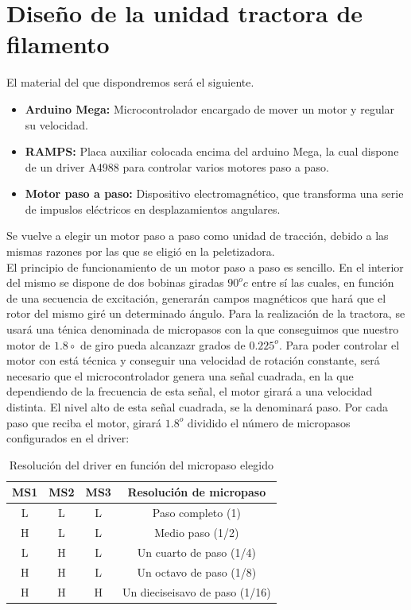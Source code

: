 
\chapter{Diseño de la unidad tractora de filamento}
\label{ane:tractora}
El material del que dispondremos será el siguiente.

\begin{itemize}
	\item{\textbf{Arduino Mega:} Microcontrolador encargado de mover un motor y regular su velocidad.}
	\item{\textbf{RAMPS:} Placa auxiliar colocada encima del arduino Mega, la cual dispone de un driver A4988 para controlar varios motores paso a paso.}
	\item{\textbf{Motor paso a paso:} Dispositivo electromagnético, que transforma una serie de impuslos eléctricos en desplazamientos angulares.}
\end{itemize}

Se vuelve a elegir un motor paso a paso como unidad de tracción, debido a las mismas razones por las que se eligió en la peletizadora.\\

El principio de funcionamiento de un motor paso a paso es sencillo. En el interior del mismo se dispone de dos bobinas giradas $90^oc$ entre sí \cite{pasoapaso} las cuales, en función de una secuencia de excitación, generarán campos magnéticos que hará que el rotor del mismo giré un determinado ángulo. Para la realización de la tractora, se usará una ténica denominada de micropasos con la que conseguimos que nuestro motor de $1.8 \circ$ de giro pueda alcanzazr grados de $0.225^o$. Para poder controlar el motor con está técnica y conseguir una velocidad de rotación constante, será necesario que el microcontrolador genera una señal cuadrada, en la que dependiendo de la frecuencia de esta señal, el motor girará a una velocidad distinta. El nivel alto de esta señal cuadrada, se la denominará paso. Por cada paso que reciba el motor, girará $1.8^o $ dividido el número de micropasos configurados en el driver:

\begin{table}[H]
    \centering
    \begin{tabular}{cccc}
        {\bf MS1} & {\bf MS2} & {\bf MS3} & {\bf Resolución de micropaso}  \\
        \hline
        L         & L         & L         & Paso completo (1)              \\
        H         & L         & L         & Medio paso (1/2)               \\
        L         & H         & L         & Un cuarto de paso (1/4)        \\
        H         & H         & L         & Un octavo de paso (1/8)        \\
        H         & H         & H         & Un dieciseisavo de paso (1/16)
    \end{tabular}
    \caption{Resolución del driver en función del micropaso elegido}
    \label{tab:res_drive}
\end{table}

